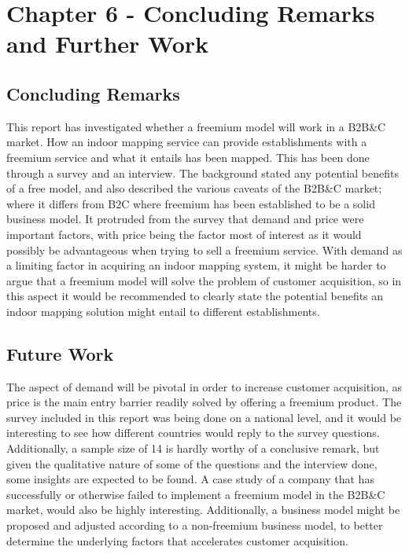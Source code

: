 \chapter{Chapter 6 - Concluding Remarks and Further Work}
\section{Concluding Remarks}
This report has investigated whether a freemium model will work in a B2B\&C market. How an indoor mapping service can provide establishments with a freemium service and what it entails has been mapped. This has been done through a survey and an interview. The background stated any potential benefits of a free model, and also described the various caveats of the B2B\&C market; where it differs from B2C where freemium has been established to be a solid business model. It protruded from the survey that demand and price were important factors, with price being the factor most of interest as it would possibly be advantageous when trying to sell a freemium service. With demand as a limiting factor in acquiring an indoor mapping system, it might be harder to argue that a freemium model will solve the problem of customer acquisition, so in this aspect it would be recommended to clearly state the potential benefits an indoor mapping solution might entail to different establishments. 


\section{Future Work}
The aspect of demand will be pivotal in order to increase customer acquisition, as price is the main entry barrier readily solved by offering a freemium product. The survey included in this report was being done on a national level, and it would be interesting to see how different countries would reply to the survey questions. Additionally, a sample size of 14 is hardly worthy of a conclusive remark, but given the qualitative nature of some of the questions and the interview done, some insights are expected to be found. A case study of a company that has successfully or otherwise failed to implement a freemium model in the B2B\&C market, would also be highly interesting. Additionally, a business model might be proposed and adjusted according to a non-freemium business model, to better determine the underlying factors that accelerates customer acquisition.
